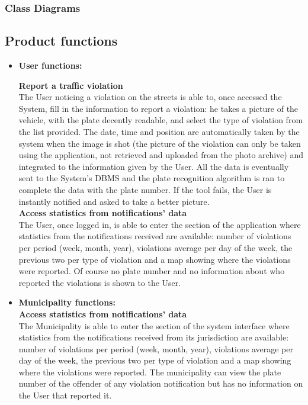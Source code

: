 \documentclass {article}
\begin{document}
		
	\subsubsection{Class Diagrams}
		

	\subsection{Product functions} 
	\begin{itemize}
	\item {\bf User functions:} 
	
	
		{\bf Report a traffic violation} \\
		The User noticing a violation on the streets is able to, once accessed the System, fill in the information to report a violation: he takes a picture of the vehicle, with the plate decently readable, and select the type of violation from the list provided. The date, time and position are automatically taken by the system when the image is shot (the picture of the violation can only be taken using the application, not retrieved and uploaded from the photo archive) and integrated to the information given by the User. All the data is eventually sent to the System’s DBMS and the plate recognition algorithm is ran to complete the data with the plate number. If the tool fails, the User is instantly notified and asked to take a better picture.\\
	
		{\bf Access statistics from notifications’ data}\\
		The User, once logged in, is able to enter the section of the application where statistics from the notifications received are available: number of violations per period (week, month, year), violations average per day of the week, the previous two per type of violation and a map showing where the violations were reported. Of course no plate number and no information about who reported the violations is shown to the User.\\
	
	\item {\bf Municipality functions:} \\
	
		{\bf Access statistics from notifications’ data}\\
		The Municipality is able to enter the section of the system interface where statistics from the notifications received from its jurisdiction are available: number of violations per period (week, month, year), violations average per day of the week, the previous two per type of violation and a map showing where the violations were reported. The municipality can view the plate number of the offender of any violation notification but has no information on the User that reported it. \\
		

\end{itemize}
\end{document}
